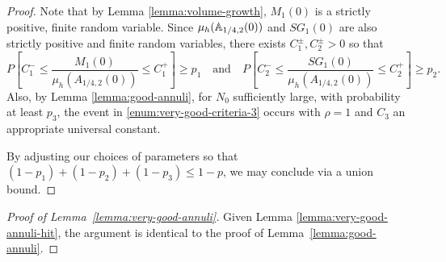 \documentclass[12pt]{amsart}
\numberwithin{equation}{section}
\newcommand{\Mrho}[2]{\hyperref[eq:alternate-size]{M_{#1}(#2)}}
\newcommand{\SGrho}[2]{\hyperref[eq:alternate-size-2]{SG_{#1}(#2)}}
\begin{document}
\begin{proof}
		Note that by Lemma \ref{lemma:volume-growth}, $\Mrho{1}{0}$ is a strictly positive, finite random variable. 
		Since $\mu_h(\mathbb{A}_{1/4, 2}(0))$ and $\SGrho{1}{0}$ are also strictly positive and finite random variables, 
		there exists $C^{\pm}_1, C^{\pm}_2 > 0$ so that 
		\begin{equation}
		P\left[C^-_1  \leq \frac{\Mrho{1}{0}}{\mu_h(A_{1/4, 2}(0))} \leq C^+_1\right] \geq p_1
		\quad \text{and} \quad
		P\left[C^-_2  \leq \frac{\SGrho{1}{0}}{\mu_h(A_{1/4, 2}(0))} \leq C^+_2\right] \geq p_2.
		\end{equation}
		Also, by Lemma \ref{lemma:good-annuli}, for $N_0$ sufficiently large, with probability at least $p_3$, the event in \ref{enum:very-good-criteria-3} occurs with $\rho = 1$ and $C_3$ an appropriate universal constant. 
		
		
		By adjusting our choices of parameters so that $(1-p_1) +  (1-p_2) + (1-p_3) \leq 1-p$, we may conclude via a union bound. 
	\end{proof}
	
	
	
	
	\begin{proof}[Proof of Lemma~\ref{lemma:very-good-annuli}]
		Given Lemma \ref{lemma:very-good-annuli-hit}, the  argument is identical to the proof of Lemma~\ref{lemma:good-annuli}.
	\end{proof}
	
\end{document}
